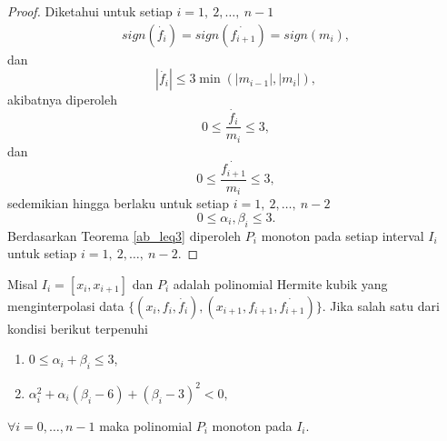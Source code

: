 \begin{proof}
    Diketahui untuk setiap $i=1,\:2,\dots,\:n-1$
    \begin{align*}
     sign(\dot{f_i})=sign(\dot{f_{i+1}})=sign(m_i),
    \end{align*}
    dan
    \begin{equation*}
        |\dot{f_i}| \leq 3 \min(|m_{i-1}|,|m_i|),
    \end{equation*}
    akibatnya diperoleh
    \begin{equation*}
        0 \leq \frac{\dot{f_i}}{m_i} \leq 3,
    \end{equation*}
    dan
    \begin{equation*}
        0 \leq \frac{\dot{f_{i+1}}}{m_i} \leq 3,
    \end{equation*}
    sedemikian hingga berlaku untuk setiap $i=1,\:2,\dots,\:n-2$
    \begin{equation*}
        0 \leq \alpha_i, \beta_i \leq 3.
    \end{equation*}
    Berdasarkan Teorema \ref{ab_leq3} diperoleh $P_i$ monoton pada setiap interval $I_i$ untuk setiap $i=1,\:2,\dots,\:n-2$.
\end{proof}

\begin{teorema}
    Misal $I_i = [x_i,x_{i+1}]$ dan $P_i$ adalah polinomial Hermite kubik yang menginterpolasi data $\{(x_i,f_i,\dot{f_i}),(x_{i+1},f_{i+1},\dot{f_{i+1}})\}$.
    Jika salah satu dari kondisi berikut terpenuhi
    \begin{enumerate}
        \item $0 \leq \alpha_i + \beta_i \leq 3$,
        \item $\alpha_i^2 + \alpha_i(\beta_i-6) + (\beta_i-3)^2 < 0,$
    \end{enumerate}
    $\forall i = 0, \dots, n-1$ maka polinomial $P_i$ monoton pada $I_i$.
\end{teorema}


